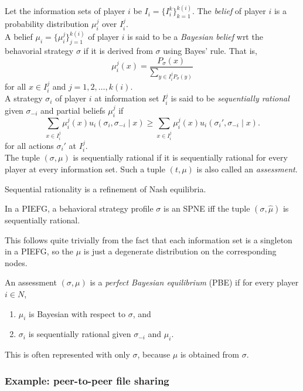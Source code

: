 		\begin{fdef}
			Let the information sets of player $i$ be $I_i = \{ I_i^k \}_{k=1}^{k(i)}$. The \emph{belief} of player $i$ is a probability distribution $\mu_i^j$ over $I_i^j$.\\
			A belief $\mu_i = \{\mu_i^j\}_{j=1}^{k(i)}$ of player $i$ is said to be a \emph{Bayesian belief} wrt the behavorial strategy $\sigma$ if it is derived from $\sigma$ using Bayes' rule. That is,
			\[ \mu_i^j(x) = \frac{P_\sigma(x)}{\sum_{y \in I_i^j P_\sigma(y)}} \]
			for all $x \in I_i^j$ and $j = 1,2,\ldots,k(i)$.\\
			A strategy $\sigma_i$ of player $i$ at information set $I_i^j$ is said to be \emph{sequentially rational} given $\sigma_{-i}$ and partial beliefs $\mu_i^j$ if
			\[ \sum_{x \in I_i^j} \mu_i^j(x) u_i(\sigma_i,\sigma_{-i} \mid x) \ge \sum_{x \in I_i^j} \mu_i^j(x) u_i(\sigma_i',\sigma_{-i} \mid x). \]
			for all actions $\sigma_i'$ at $I_i^j$.\\
			The tuple $(\sigma,\mu)$ is sequentially rational if it is sequentially rational for every player at every information set. Such a tuple $(t,\mu)$ is also called an \emph{assessment}.
		\end{fdef}

		Sequential rationality is a refinement of Nash equilibria.

		\begin{fprop}
			In a PIEFG, a behavioral strategy profile $\sigma$ is an SPNE iff the tuple $(\sigma,\hat{\mu})$ is sequentially rational.
		\end{fprop}
		This follows quite trivially from the fact that each information set is a singleton in a PIEFG, so the $\mu$ is just a degenerate distribution on the corresponding nodes.

		\begin{fdef}
			An assessment $(\sigma,\mu)$ is a \emph{perfect Bayesian equilibrium} (PBE) if for every player $i \in N$,
			\begin{enumerate}
				\item $\mu_i$ is Bayesian with respect to $\sigma$, and
				\item $\sigma_i$ is sequentially rational given $\sigma_{-i}$ and $\mu_i$.
			\end{enumerate}
		\end{fdef}
		This is often represented with only $\sigma$, because $\mu$ is obtained from $\sigma$.

	\subsubsection{Example: peer-to-peer file sharing}

